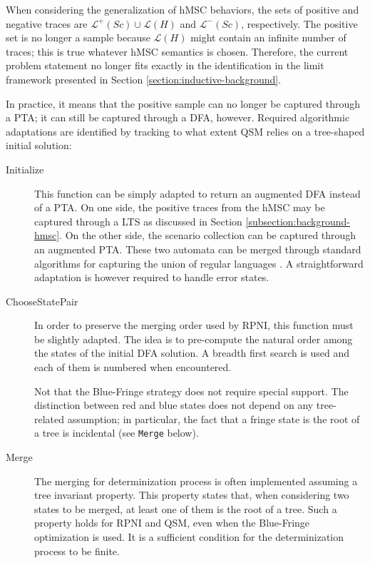 When considering the generalization of hMSC behaviors, the sets of positive and negative traces are $\mathcal{L}^+(Sc) \cup \mathcal{L}(H)$ and $\mathcal{L}^-(Sc)$, respectively. The positive set is no longer a sample because $\mathcal{L}(H)$ might contain an infinite number of traces; this is true whatever hMSC semantics is chosen. Therefore, the current problem statement no longer fits exactly in the identification in the limit framework presented in Section \ref{section:inductive-background}.

In practice, it means that the positive sample can no longer be captured through a PTA; it can still be captured through a DFA, however. Required algorithmic adaptations are identified by tracking to what extent QSM relies on a tree-shaped initial solution:

\begin{description}

\item[Initialize] This function can be simply adapted to return an augmented DFA instead of a PTA. On one side, the positive traces from the hMSC may be captured through a LTS as discussed in Section \ref{subsection:background-hmsc}. On the other side, the scenario collection can be captured through an augmented PTA. These two automata can be merged through standard algorithms for capturing the union of regular languages \cite{Hopcroft:1979}. A straightforward adaptation is however required to handle error states. 

\item[ChooseStatePair] In order to preserve the merging order used by RPNI, this function must be slightly adapted. The idea is to pre-compute the natural order among the states of the initial DFA solution. A breadth first search is used and each of them is numbered when encountered. 

Not that the Blue-Fringe strategy does not require special support. The distinction between red and blue states does not depend on any tree-related assumption; in particular, the fact that a fringe state is the root of a tree is incidental (see \texttt{Merge} below).

\item[Merge] The merging for determinization process is often implemented assuming a tree invariant property. This property states that, when considering two states to be merged, at least one of them is the root of a tree. Such a property holds for RPNI and QSM, even when the Blue-Fringe optimization is used. It is a sufficient condition for the determinization process to be finite. 


\end{description}
